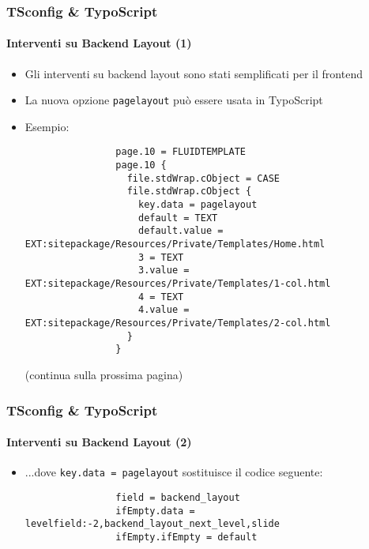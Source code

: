 \begin{frame}[fragile]
	\frametitle{TSconfig \& TypoScript}
	\framesubtitle{Interventi su Backend Layout (1)}

	\lstset{basicstyle=\tiny\ttfamily}

	\begin{itemize}

		\item Gli interventi su backend layout sono stati semplificati per il frontend

		\item La nuova opzione \texttt{pagelayout} può essere usata in TypoScript

		\item Esempio:

			\begin{lstlisting}
				page.10 = FLUIDTEMPLATE
				page.10 {
				  file.stdWrap.cObject = CASE
				  file.stdWrap.cObject {
				    key.data = pagelayout
				    default = TEXT
				    default.value = EXT:sitepackage/Resources/Private/Templates/Home.html
				    3 = TEXT
				    3.value = EXT:sitepackage/Resources/Private/Templates/1-col.html
				    4 = TEXT
				    4.value = EXT:sitepackage/Resources/Private/Templates/2-col.html
				  }
				}
			\end{lstlisting}

			\smaller
				(continua sulla prossima pagina)
			\normalsize

	\end{itemize}

\end{frame}


\begin{frame}[fragile]
	\frametitle{TSconfig \& TypoScript}
	\framesubtitle{Interventi su Backend Layout (2)}

	\lstset{basicstyle=\tiny\ttfamily}

	\begin{itemize}

		\item ...dove \texttt{key.data = pagelayout} sostituisce il codice seguente:

			\begin{lstlisting}
				field = backend_layout
				ifEmpty.data = levelfield:-2,backend_layout_next_level,slide
				ifEmpty.ifEmpty = default
			\end{lstlisting}

	\end{itemize}

\end{frame}

